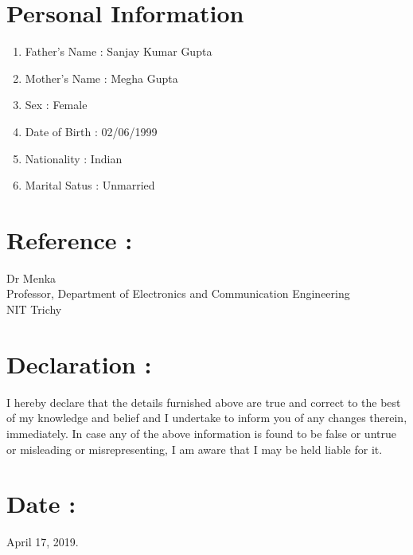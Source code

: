 \documentclass[10pt]{article} %
\begin{document}
\section*{Personal Information}
\begin{enumerate}

\item Father's Name : Sanjay Kumar Gupta
\item Mother's Name : Megha Gupta
\item Sex : Female
\item Date of Birth : 02/06/1999
\item Nationality : Indian
\item Marital Satus : Unmarried 

\end{enumerate}


\section*{Reference :}

Dr Menka\\
Professor, Department of Electronics and Communication Engineering\\
NIT Trichy




\section*{Declaration :}
I hereby declare that the details furnished above are true and correct to the best of my knowledge and belief and I undertake to inform you of any changes therein, immediately. In case any of the above information is found to be false or untrue or misleading or misrepresenting, I am aware that I may be held liable for it. 

\section*{Date :}
April 17, 2019.
\end{document}
